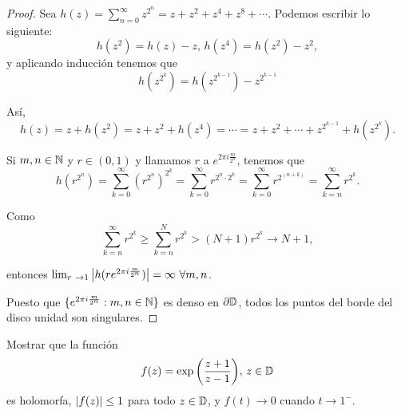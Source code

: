 \begin{proof}
     Sea $h(z) = \sum_{n=0}^{\infty} z^{2^n} = z + z^2 + z^4 + z^8 + \cdots$. Podemos escribir lo siguiente:
    \begin{equation*}
         h(z^2) = h(z) - z, \,
         h(z^4) = h(z^2) - z^2,
    \end{equation*}
    y aplicando inducción tenemos que
    \begin{equation*}
        h(z^{2^k}) = h(z^{2^{k-1}}) - z^{2^{k-1}}
    \end{equation*}

    Así,
    \begin{equation*}
        h(z) = z + h(z^2) = z + z^2 + h(z^4) = \cdots = z + z^2 + \cdots + z^{2^{k-1}} + h(z^{2^k}).
    \end{equation*}

    Si $m, n \in \mathbb{N}$ y $r \in (0,1)$ y llamamos $r$ a $e^{2 \pi i \frac{m}{2^n}}$, tenemos que
    \begin{equation*}
        h(r^{2^n}) = \sum_{k=0}^{\infty} (r^{2^n})^{2^k} = \sum_{k=0}^{\infty} r^{2^n \cdot 2^k} = \sum_{k=0}^{\infty} r^{2^{(n+k)}} =  \sum_{k=n}^{\infty} r^{2^k}.
    \end{equation*}

    Como
    \begin{equation*}
        \sum_{k=n}^{\infty} r^{2^k} \geq \sum_{k=n}^{N} r^{2^k} > (N + 1) r^{2^k} \rightarrow N + 1,
    \end{equation*}

    entonces $\lim_{r \rightarrow 1} \abs{h(re^{2 \pi i \frac{m}{2^n}})} = \infty \, \, \forall m, n$. \\ \par

    Puesto que $\{e^{2 \pi i \frac{m}{2^n}} : m, n \in \mathbb{N}\}$ es denso en $\partial \mathbb{D}$, todos los puntos del borde del disco unidad son singulares.
\end{proof}


\begin{example}
    Mostrar que la función
    \begin{equation*}
        f(z) = \exp{\left(\frac{z + 1}{z - 1}\right)}, \, z \in \mathbb{D}
    \end{equation*}
    es holomorfa, $\left\lvert f(z)\right\rvert \leq 1$ para todo $z \in \mathbb{D}$, y $f(t) \rightarrow 0$ cuando $t \rightarrow 1^-$.
\end{example}


